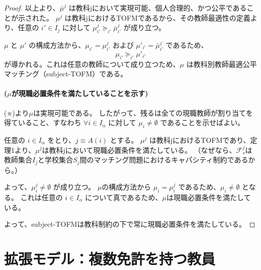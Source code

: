 \documentclass[12pt, a4paper]{article}
\theoremstyle{definition}
\theoremstyle{remark}
\theoremstyle{plain}
\begin{document}
\begin{proof}
\vspace{\baselineskip}

以上より、$\bar{\mu}^j$ は教科jにおいて実現可能、個人合理的、かつ公平であることが示された。
$\mu^j$ は教科jにおけるTOFMであるから、その教師最適性の定義より、任意の $i' \in I_j$ に対して $\mu^j_{i'} \succeq_{i'} \bar{\mu}^j_{i'}$ が成り立つ。

$\mu$ と $\mu'$ の構成方法から、$\mu_{i'} = \mu^j_{i'}$ および $\mu'_{i'} = \bar{\mu}^j_{i'}$ であるため、
\[
 \mu_{i'} \succeq_{i'} \mu'_{i'}
\]
が導かれる。これは任意の教師について成り立つため、$\mu$ は教科別教師最適公平マッチング（subject-TOFM）である。

\paragraph{($\mu$が現職必置条件を満たしていることを示す)}
(※)より$\mu$は実現可能である。
したがって、残るは全ての現職教師が割り当てを得ていること、すなわち $\forall i \in I_\alpha$ に対して $\mu_i \neq \emptyset$ であることを示せばよい。

任意の $i \in I_\alpha$ をとり、$j \equiv A(i)$ とする。
$\mu^j$ は教科jにおけるTOFMであり、定理1より、$\mu^j$は教科jにおいて現職必置条件を満たしている。
（なぜなら、$\mathcal{F}^j_s$は教師集合$I_j$と学校集合$S_j$間のマッチング問題におけるキャパシティ制約であるから。）

よって、$\mu^j_i \neq \emptyset$ が成り立つ。
$\mu$の構成方法から $\mu_i = \mu^j_i$ であるため、$\mu_i \neq \emptyset$ となる。
これは任意の $i \in I_\alpha$ について真であるため、$\mu$は現職必置条件を満たしている。

よって、subject-TOFMは教科制約の下で常に現職必置条件を満たしている。


\end{proof}




\section{拡張モデル：複数免許を持つ教員}
\end{document}

